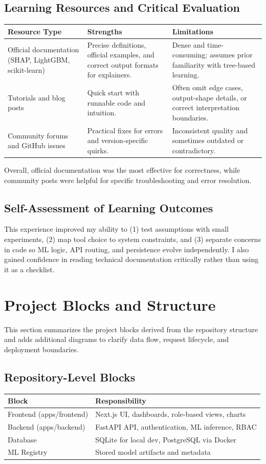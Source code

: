 \documentclass[12pt]{article}
\begin{document}
\subsection{Learning Resources and Critical Evaluation}
\begin{longtable}{p{4.2cm}p{5.5cm}p{5.0cm}}
\toprule
\textbf{Resource Type} & \textbf{Strengths} & \textbf{Limitations} \\ \midrule
Official documentation (SHAP, LightGBM, scikit-learn) & Precise definitions, official examples, and correct output formats for explainers. & Dense and time-consuming; assumes prior familiarity with tree-based learning. \\
Tutorials and blog posts & Quick start with runnable code and intuition. & Often omit edge cases, output-shape details, or correct interpretation boundaries. \\
Community forums and GitHub issues & Practical fixes for errors and version-specific quirks. & Inconsistent quality and sometimes outdated or contradictory. \\
\bottomrule
\end{longtable}

Overall, official documentation was the most effective for correctness, while community posts were helpful for specific troubleshooting and error resolution.

\subsection{Self-Assessment of Learning Outcomes}
This experience improved my ability to (1) test assumptions with small experiments, (2) map tool choice to system constraints, and (3) separate concerns in code so ML logic, API routing, and persistence evolve independently. I also gained confidence in reading technical documentation critically rather than using it as a checklist.
\newpage

\section{Project Blocks and Structure}
This section summarizes the project blocks derived from the repository structure and adds additional diagrams to clarify data flow, request lifecycle, and deployment boundaries.

\subsection{Repository-Level Blocks}
\begin{longtable}{ll}
\toprule
\textbf{Block} & \textbf{Responsibility} \\ \midrule
Frontend (apps/frontend) & Next.js UI, dashboards, role-based views, charts \\ 
Backend (apps/backend) & FastAPI API, authentication, ML inference, RBAC \\ 
Database & SQLite for local dev, PostgreSQL via Docker \\ 
ML Registry & Stored model artifacts and metadata \\ 
\bottomrule
\end{longtable}
\end{document}
